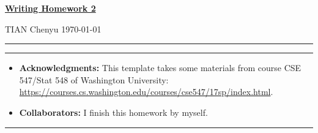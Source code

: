 \documentclass[a4paper]{article}
\begin{document}
\courseheader



\setcounter{hwcnt}{2} %

\begin{center}
  \underline{\bf Writing Homework 2}%
\end{center}
\begin{flushleft}
  TIAN Chenyu\hfill
  \today
\end{flushleft}
\hrule

\vspace{2em}

\flushleft
\rule{\textwidth}{1pt}
\begin{itemize}
\item {\bf Acknowledgments: \/} 
  This template takes some materials from course CSE 547/Stat 548 of Washington University: \small{\url{https://courses.cs.washington.edu/courses/cse547/17sp/index.html}}.
\item {\bf Collaborators: \/}
  I finish this homework by myself.
\end{itemize}
\rule{\textwidth}{1pt}

\vspace{2em}

\end{document}
